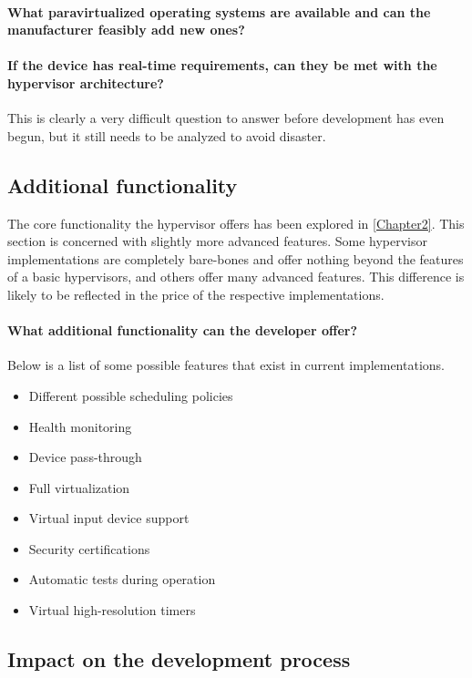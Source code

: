 \paragraph{What paravirtualized operating systems are available and can the manufacturer feasibly add new ones?}

\paragraph{If the device has real-time requirements, can they be met with the hypervisor architecture?}
This is clearly a very difficult question to answer before development has even begun, but it still needs to be analyzed to avoid disaster.
\subsection{Additional functionality}
The core functionality the hypervisor offers has been explored in \ref{Chapter2}. This section is concerned with slightly more advanced features. Some hypervisor implementations are completely bare-bones and offer nothing beyond the features of a basic hypervisors, and others offer many advanced features. This difference is likely to be reflected in the price of the respective implementations.
\paragraph{What additional functionality can the developer offer?}
Below is a list of some possible features that exist in current implementations.
\begin{itemize}
    \item Different possible scheduling policies
    \item Health monitoring
    \item Device pass-through
    \item Full virtualization
    \item Virtual input device support
    \item Security certifications
    \item Automatic tests during operation
    \item Virtual high-resolution timers
\end{itemize}

\subsection{Impact on the development process}

